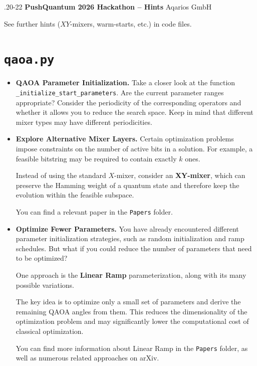 \documentclass[10pt,a4paper]{article}
\begin{document}
.20-22 \hfill \textbf{PushQuantum 2026 Hackathon -- Hints} \hfill Aqarios GmbH

\begin{center}
    \Large See further hints ($XY$-mixers, warm-starts, etc.) in code files.
\end{center}

\section*{\texttt{qaoa.py}}


\begin{itemize}
    \item[1.] \textbf{QAOA Parameter Initialization.}
    Take a closer look at the function
    \texttt{\_initialize\_start\_parameters}.
    Are the current parameter ranges appropriate?
    Consider the periodicity of the corresponding
    operators and whether it allows you to reduce
    the search space. Keep in mind that different
    mixer types may have different periodicities.



    \item[2.] \textbf{Explore Alternative Mixer Layers.}
    Certain optimization problems impose constraints
    on the number of active bits in a solution.
    For example, a feasible bitstring may be
    required to contain exactly $k$ ones.

    Instead of using the standard $X$-mixer,
    consider an \textbf{XY-mixer}, which can
    preserve the Hamming weight of a quantum state
    and therefore keep the evolution within the
    feasible subspace.

    You can find a relevant paper in the
    \texttt{Papers} folder.



    \item[3.] \textbf{Optimize Fewer Parameters.}
    You have already encountered different
    parameter initialization strategies, such as
    random initialization and ramp schedules.
    But what if you could reduce the number of
    parameters that need to be optimized?

    One approach is the \textbf{Linear Ramp}
    parameterization, along with its many
    possible variations.

    The key idea is to optimize only a small
    set of parameters and derive the remaining
    QAOA angles from them. This reduces the
    dimensionality of the optimization problem
    and may significantly lower the computational
    cost of classical optimization.

    You can find more information about Linear
    Ramp in the \texttt{Papers} folder, as well
    as numerous related approaches on arXiv.

\end{itemize}
\end{document}
